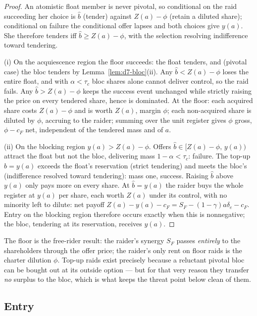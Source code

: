 \begin{proof}
An atomistic float member is never pivotal, so conditional on the raid succeeding her choice is $\hat b$ (tender) against $Z(a)-\phi$ (retain a diluted share); conditional on failure the conditional offer lapses and both choices give $y(a)$. She therefore tenders iff $\hat b\ge Z(a)-\phi$, with the selection resolving indifference toward tendering.

(i) On the acquiescence region the floor succeeds: the float tenders, and (pivotal case) the bloc tenders by Lemma~\ref{lem:d7-bloc}(ii). Any $\hat b<Z(a)-\phi$ loses the entire float, and with $\alpha<\tau_{c}$ bloc shares alone cannot deliver control, so the raid fails. Any $\hat b>Z(a)-\phi$ keeps the success event unchanged while strictly raising the price on every tendered share, hence is dominated. At the floor: each acquired share costs $Z(a)-\phi$ and is worth $Z(a)$, margin $\phi$; each non-acquired share is diluted by $\phi$, accruing to the raider; summing over the unit register gives $\phi$ gross, $\phi-c_{F}$ net, independent of the tendered mass and of $a$.

(ii) On the blocking region $y(a)>Z(a)-\phi$. Offers $\hat b\in[Z(a)-\phi,\,y(a))$ attract the float but not the bloc, delivering mass $1-\alpha<\tau_{c}$: failure. The top-up $\hat b=y(a)$ exceeds the float's reservation (strict tendering) and meets the bloc's (indifference resolved toward tendering): mass one, success. Raising $\hat b$ above $y(a)$ only pays more on every share. At $\hat b=y(a)$ the raider buys the whole register at $y(a)$ per share, each worth $Z(a)$ under its control, with no minority left to dilute: net payoff $Z(a)-y(a)-c_{F}=S_{F}-(1-\gamma)a\delta_{e}-c_{F}$. Entry on the blocking region therefore occurs exactly when this is nonnegative; the bloc, tendering at its reservation, receives $y(a)$.
\end{proof}

The floor is the free-rider result: the raider's synergy $S_{F}$ passes \emph{entirely} to the shareholders through the offer price; the raider's only rent on floor raids is the charter dilution $\phi$. Top-up raids exist precisely because a reluctant pivotal bloc can be bought out at its outside option --- but for that very reason they transfer \emph{no} surplus to the bloc, which is what keeps the threat point below clean of them.

\subsection{Entry}

